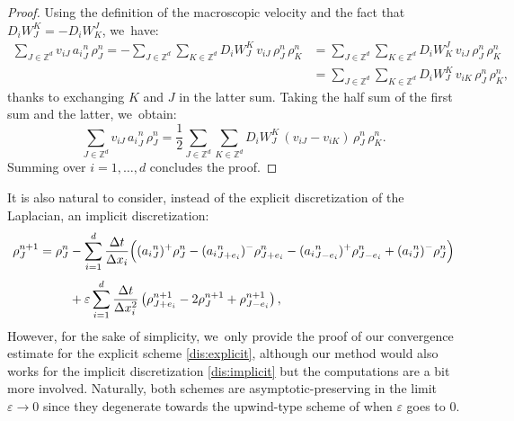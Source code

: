 \documentclass[JEP,XML,SOM,Unicode, NoFloatCountersInSection,published]{cedram}
\def\ZZ{\mathbb{Z}}
\def\eps{\varepsilon}
\def\dt{\Delta t}
\def\dx{\Delta x}
\theoremstyle{plain}
\theoremstyle{definition}
\begin{document}
\begin{proof}
Using the definition of the macroscopic velocity and the fact that $D_iW_{J}^{K} = -D_iW^{J}_{K}$, we~have:
\begin{align*}
\sum_{J\in \ZZ^d} v_{iJ} \, {a_i}^n_{J} \, \rho_{J}^n = - \sum_{J\in \ZZ^d} \sum_{K\in \ZZ^d} D_iW_J^K \, v_{iJ} \, \rho_{J}^n \, \rho_{K}^n & = \sum_{J\in \ZZ^d} \sum_{K\in \ZZ^d} D_iW_K^J \, v_{iJ} \, \rho_{J}^n \, \rho_{K}^n \\
& = \sum_{J\in \ZZ^d} \sum_{K\in \ZZ^d} D_iW_J^K \, v_{iK} \, \rho_{J}^n \, \rho_{K}^n,
\end{align*}
thanks to exchanging $K$ and $J$ in the latter sum. Taking the half sum of the first sum and the latter, we~obtain:
\[
\sum_{J\in \ZZ^d} v_{iJ} \, {a_i}^n_{J} \, \rho_{J}^n = \frac 12 \sum_{J\in \ZZ^d} \sum_{K\in \ZZ^d} D_iW_J^K \, (v_{iJ} - v_{iK}) \, \rho_{J}^n \, \rho_{K}^n.
\]
Summing over $i=1, \ldots, d$ concludes the proof.
\end{proof}
It is also natural to consider, instead of the explicit discretization of the Laplacian, an implicit discretization:
\begin{align}\label{dis:implicit}
\rho_{J}^{n+1} = \rho_{J}^n &- \sum_{i=1}^{d} \frac{\dt}{\dx_i}
\Big(({a_i}^n_{J})^+ \rho_{J}^n - ({a_i}^n_{J+e_i})^- \rho_{J+e_i}^n
-({a_i}^n_{J-e_i})^+ \rho_{J-e_i}^n + ({a_i}^n_{J})^- \rho_{J}^n \Big)\notag \\[-5pt]
\\[-8pt]
& + \eps \sum_{i=1}^{d} \frac{\dt}{\dx_i^2} \left(\rho_{J+e_i}^{n+1} - 2\rho_J^{n+1} + \rho_{J-e_i}^{n+1} \right),\notag
\end{align}
However, for the sake of simplicity, we~only provide the proof of our convergence estimate for the explicit scheme \eqref{dis:explicit}, although our method would also works for the implicit discretization \eqref{dis:implicit} but the computations are a bit more involved. Naturally, both schemes are asymptotic-preserving in the limit $\eps \to 0$ since they degenerate towards the upwind-type scheme of \cite{dlv20} when $\eps$ goes to 0.
\end{document}
